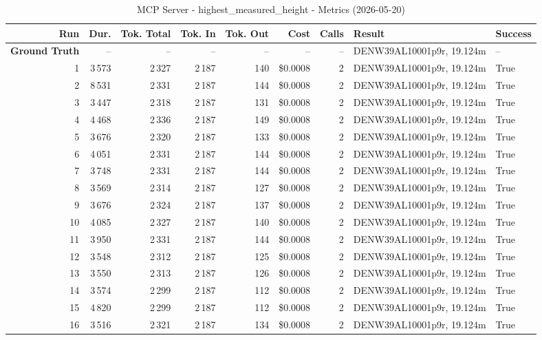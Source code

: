 \documentclass[a4paper,11pt]{article}
\begin{document}
\begin{table}[ht]
\centering
\scriptsize
\caption{MCP Server - highest\_measured\_height - Metrics (2026-05-20)}
\label{tab:mcp\_highest\_measured\_height\_metrics\_2026-05-20}
\begin{tabular}{r r r r r r r p{3cm} l}
\hline
Run & Dur. & Tok. Total & Tok. In & Tok. Out & Cost & Calls & Result & Success \\
\hline
\textbf{Ground Truth} & -- & -- & -- & -- & -- & -- & DENW39AL10001p9r, 19.124m & -- \\
\hline
1 & 3\,573 & 2\,327 & 2\,187 & 140 & \$0.0008 & 2 & DENW39AL10001p9r, 19.124m & True \\
2 & 8\,531 & 2\,331 & 2\,187 & 144 & \$0.0008 & 2 & DENW39AL10001p9r, 19.124m & True \\
3 & 3\,447 & 2\,318 & 2\,187 & 131 & \$0.0008 & 2 & DENW39AL10001p9r, 19.124m & True \\
4 & 4\,468 & 2\,336 & 2\,187 & 149 & \$0.0008 & 2 & DENW39AL10001p9r, 19.124m & True \\
5 & 3\,676 & 2\,320 & 2\,187 & 133 & \$0.0008 & 2 & DENW39AL10001p9r, 19.124m & True \\
6 & 4\,051 & 2\,331 & 2\,187 & 144 & \$0.0008 & 2 & DENW39AL10001p9r, 19.124m & True \\
7 & 3\,748 & 2\,331 & 2\,187 & 144 & \$0.0008 & 2 & DENW39AL10001p9r, 19.124m & True \\
8 & 3\,569 & 2\,314 & 2\,187 & 127 & \$0.0008 & 2 & DENW39AL10001p9r, 19.124m & True \\
9 & 3\,676 & 2\,324 & 2\,187 & 137 & \$0.0008 & 2 & DENW39AL10001p9r, 19.124m & True \\
10 & 4\,085 & 2\,327 & 2\,187 & 140 & \$0.0008 & 2 & DENW39AL10001p9r, 19.124m & True \\
11 & 3\,950 & 2\,331 & 2\,187 & 144 & \$0.0008 & 2 & DENW39AL10001p9r, 19.124m & True \\
12 & 3\,548 & 2\,312 & 2\,187 & 125 & \$0.0008 & 2 & DENW39AL10001p9r, 19.124m & True \\
13 & 3\,550 & 2\,313 & 2\,187 & 126 & \$0.0008 & 2 & DENW39AL10001p9r, 19.124m & True \\
14 & 3\,574 & 2\,299 & 2\,187 & 112 & \$0.0008 & 2 & DENW39AL10001p9r, 19.124m & True \\
15 & 4\,820 & 2\,299 & 2\,187 & 112 & \$0.0008 & 2 & DENW39AL10001p9r, 19.124m & True \\
16 & 3\,516 & 2\,321 & 2\,187 & 134 & \$0.0008 & 2 & DENW39AL10001p9r, 19.124m & True \\

\end{tabular}
\end{table}
\end{document}
